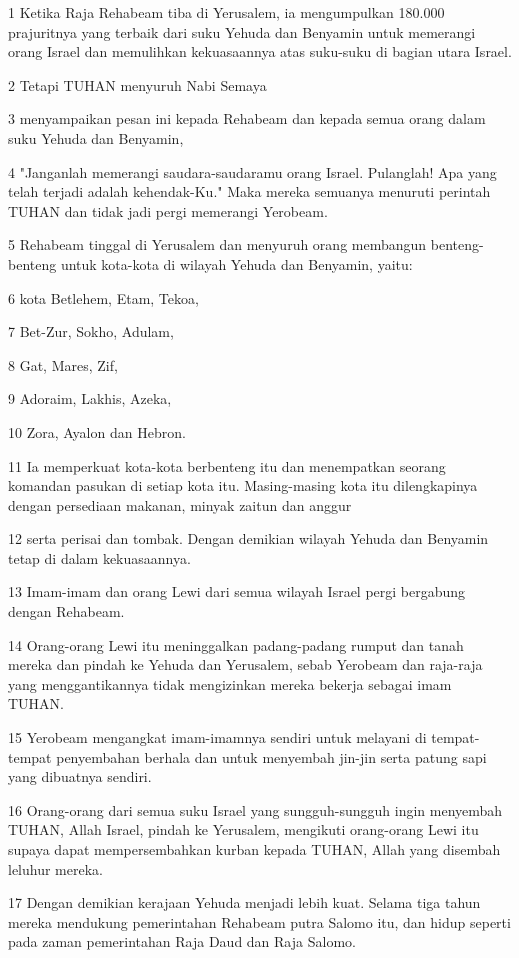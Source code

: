 \par 1 Ketika Raja Rehabeam tiba di Yerusalem, ia mengumpulkan 180.000 prajuritnya yang terbaik dari suku Yehuda dan Benyamin untuk memerangi orang Israel dan memulihkan kekuasaannya atas suku-suku di bagian utara Israel.
\par 2 Tetapi TUHAN menyuruh Nabi Semaya
\par 3 menyampaikan pesan ini kepada Rehabeam dan kepada semua orang dalam suku Yehuda dan Benyamin,
\par 4 "Janganlah memerangi saudara-saudaramu orang Israel. Pulanglah! Apa yang telah terjadi adalah kehendak-Ku." Maka mereka semuanya menuruti perintah TUHAN dan tidak jadi pergi memerangi Yerobeam.
\par 5 Rehabeam tinggal di Yerusalem dan menyuruh orang membangun benteng-benteng untuk kota-kota di wilayah Yehuda dan Benyamin, yaitu:
\par 6 kota Betlehem, Etam, Tekoa,
\par 7 Bet-Zur, Sokho, Adulam,
\par 8 Gat, Mares, Zif,
\par 9 Adoraim, Lakhis, Azeka,
\par 10 Zora, Ayalon dan Hebron.
\par 11 Ia memperkuat kota-kota berbenteng itu dan menempatkan seorang komandan pasukan di setiap kota itu. Masing-masing kota itu dilengkapinya dengan persediaan makanan, minyak zaitun dan anggur
\par 12 serta perisai dan tombak. Dengan demikian wilayah Yehuda dan Benyamin tetap di dalam kekuasaannya.
\par 13 Imam-imam dan orang Lewi dari semua wilayah Israel pergi bergabung dengan Rehabeam.
\par 14 Orang-orang Lewi itu meninggalkan padang-padang rumput dan tanah mereka dan pindah ke Yehuda dan Yerusalem, sebab Yerobeam dan raja-raja yang menggantikannya tidak mengizinkan mereka bekerja sebagai imam TUHAN.
\par 15 Yerobeam mengangkat imam-imamnya sendiri untuk melayani di tempat-tempat penyembahan berhala dan untuk menyembah jin-jin serta patung sapi yang dibuatnya sendiri.
\par 16 Orang-orang dari semua suku Israel yang sungguh-sungguh ingin menyembah TUHAN, Allah Israel, pindah ke Yerusalem, mengikuti orang-orang Lewi itu supaya dapat mempersembahkan kurban kepada TUHAN, Allah yang disembah leluhur mereka.
\par 17 Dengan demikian kerajaan Yehuda menjadi lebih kuat. Selama tiga tahun mereka mendukung pemerintahan Rehabeam putra Salomo itu, dan hidup seperti pada zaman pemerintahan Raja Daud dan Raja Salomo.
